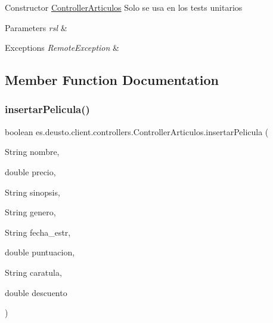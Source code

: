 Constructor \mbox{\hyperlink{classes_1_1deusto_1_1client_1_1controllers_1_1_controller_articulos}{Controller\+Articulos}} Solo se usa en los tests unitarios 
\begin{DoxyParams}{Parameters}
{\em rsl} & \\
\hline
\end{DoxyParams}

\begin{DoxyExceptions}{Exceptions}
{\em Remote\+Exception} & \\
\hline
\end{DoxyExceptions}


\subsection{Member Function Documentation}
\mbox{\label{classes_1_1deusto_1_1client_1_1controllers_1_1_controller_articulos_a64c5bfffa1bbd9c9d8c2cd4b07544dba}} 
\subsubsection{\texorpdfstring{insertarPelicula()}{insertarPelicula()}}
{\footnotesize\ttfamily boolean es.\+deusto.\+client.\+controllers.\+Controller\+Articulos.\+insertar\+Pelicula (\begin{DoxyParamCaption}\item[{String}]{nombre,  }\item[{double}]{precio,  }\item[{String}]{sinopsis,  }\item[{String}]{genero,  }\item[{String}]{fecha\+\_\+estr,  }\item[{double}]{puntuacion,  }\item[{String}]{caratula,  }\item[{double}]{descuento }\end{DoxyParamCaption})}

